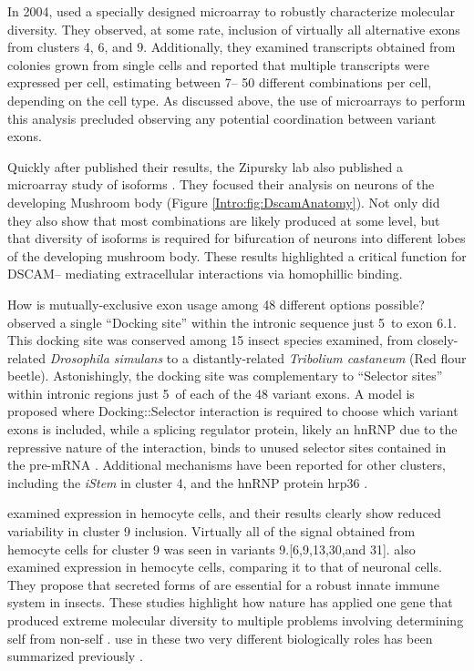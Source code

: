     In 2004, \citet{Neves2004} used a specially designed microarray to robustly characterize \dscam{} molecular diversity. They observed, at some rate, inclusion of virtually all alternative exons from clusters 4, 6, and 9. Additionally, they examined \dscam{} transcripts obtained from colonies grown from single cells and reported that multiple \dscam{} transcripts were expressed per cell, estimating between 7-- 50 different combinations per cell, depending on the cell type. As discussed above, the use of microarrays to perform this analysis precluded observing any potential coordination between variant exons.

    Quickly after \citet{Neves2004} published their results, the Zipursky lab also published a microarray study of \dscam{} isoforms \citep{Zhan2004}. They focused their analysis on neurons of the developing Mushroom body (Figure \ref{Intro:fig:DscamAnatomy}). Not only did they also show that most \dscam{} combinations are likely produced at some level, but that diversity of isoforms is required for bifurcation of neurons into different lobes of the developing mushroom body. These results highlighted a critical function for DSCAM-- mediating extracellular interactions via homophillic binding.

    How is mutually-exclusive exon usage among 48 different options possible? \citet{Graveley2005b} observed a single ``Docking site'' within the intronic sequence just 5\textprime~to exon 6.1. This docking site was conserved among 15 insect species examined, from closely-related \textit{Drosophila simulans} to a distantly-related \textit{Tribolium castaneum} (Red flour beetle). Astonishingly, the docking site was complementary to ``Selector sites'' within intronic regions just 5\textprime~of each of the 48 variant exons. A model is proposed where Docking::Selector interaction is required to choose which variant exons is included, while a splicing regulator protein, likely an hnRNP due to the repressive nature of the interaction, binds to unused selector sites contained in the pre-mRNA \citep{Graveley2000}. Additional mechanisms have been reported for other clusters, including the \textit{iStem} \citep{Kreahling2005} in cluster 4, and the hnRNP protein hrp36 \citep{Olson2007}.

    \citep{Neves2004} examined \dscam{} expression in hemocyte cells, and their results clearly show reduced variability in cluster 9 inclusion. Virtually all of the signal obtained from hemocyte cells for cluster 9 was seen in variants 9.[6,9,13,30,and 31]. \citep{Watson2005} also examined \dscam{} expression in hemocyte cells, comparing it to that of neuronal cells. They propose that secreted forms of \dscam{} are essential for a robust innate immune system in insects. These studies highlight how nature has applied one gene that produced extreme molecular diversity to multiple problems involving determining self from non-self \citep{Shi2012a, Hattori2008}. \dscam{} use in these two very different biologically roles has been summarized previously \citep{Hemani2012}.

